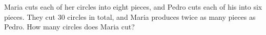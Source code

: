 Maria cuts each of her circles into eight pieces, and Pedro cuts each of his into six pieces. They cut $30$ circles in total, and Maria produces twice as many pieces as Pedro. How many circles does Maria cut?
